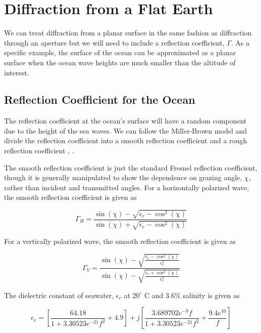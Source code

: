 \section {Diffraction from a Flat Earth}
We can treat diffraction from a planar surface in the same fashion as diffraction through an aperture but we will need to include a reflection coefficient, $\Gamma$. As a specific example, the surface of the ocean can be approximated as a planar surface when the ocean wave heights are much smaller than the altitude of interest.

\subsection{Reflection Coefficient for the Ocean}
The reflection coefficient at the ocean’s surface will have a random component due to the height of the sea waves. We can follow the Miller-Brown model and divide the reflection coefficient into a smooth reflection coefficient and a rough reflection coefficient \cite{miller_reflection}, \cite{lohrmann_rcs}. 

The smooth reflection coefficient is just the standard Fresnel reflection coefficient, though it is generally manipulated to show the dependence on grazing angle, $\chi$, rather than incident and transmitted angles. For a horizontally polarized wave, the smooth reflection coefficient is given as

\begin{equation}
\Gamma_H = \frac{\sin(\chi) - \sqrt{\epsilon_r - \cos^2(\chi)}}{\sin(\chi) + \sqrt{\epsilon_r - \cos^2(\chi)}}
\label{gf_mb:1}
\end{equation}
\renewcommand{\baselinestretch}{2} \small\normalsize

\noindent For a vertically polarized wave, the smooth reflection coefficient is given as

\begin{equation}
\Gamma_V = \frac{\sin(\chi) - \sqrt{\frac{\epsilon_r - \cos^2(\chi)}{\epsilon_r^2} }}{\sin(\chi) - \sqrt{\frac{\epsilon_r + \cos^2(\chi)}{\epsilon_r^2} }}
\label{gf_mb:2}
\end{equation}
\renewcommand{\baselinestretch}{2} \small\normalsize

The dielectric constant of seawater, $\epsilon_r$ at $20^{\circ}$ C and $3.6\%$ salinity is given as \cite{temper_guide}

\begin{equation}
\epsilon_r = \left[\frac{64.18}{1+3.30523e^{-21}f^2} + 4.9 \right]+ j\left[\frac{3.689702e^{-9}f}{1+3.30523e^{-21}f^2} + \frac{9.4e^{10}}{f}\right]
\label{gf_mb:3}
\end{equation}
\renewcommand{\baselinestretch}{2} \small\normalsize

